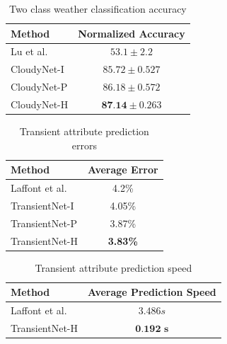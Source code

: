 \documentclass[10pt,twocolumn,letterpaper]{article}
\begin{document}
\begin{table}[t]
	\centering
	\caption{Two class weather classification accuracy}
	\begin{tabular}{ | l | c | }
		\hline
			Method & Normalized Accuracy \\ \hline \hline
			Lu et al.~\cite{lutwoclass}& $ 53.1 \pm 2.2 $ \\ \hline
			CloudyNet-I & $ 85.72 \pm 0.527 $ \\ \hline
			CloudyNet-P & $ 86.18 \pm 0.572 $ \\ \hline
			CloudyNet-H & $ \textbf{87.14} \pm 0.263 $ \\ 
		\hline
	\end{tabular}
	\label{tbl:twoclass}
\end{table}

\begin{table}[t]
	\centering
	\caption{Transient attribute prediction errors}
	\begin{tabular}{ | l | c | }
		\hline
			Method & Average Error \\ \hline \hline
			Laffont et al.~\cite{Laffont14}& 4.2\% \\ \hline
			TransientNet-I & 4.05\% \\ \hline
			TransientNet-P & 3.87\% \\ \hline
			TransientNet-H & \textbf{3.83\%} \\ 
		\hline
	\end{tabular}
	\label{tbl:transient}
\end{table}

\begin{table}[t]
	\centering
	\caption{Transient attribute prediction speed}
	\begin{tabular}{ | l | c | }
		\hline
			Method & Average Prediction Speed \\ \hline \hline
			Laffont et al.~\cite{Laffont14}& $ 3.486 s $ \\ \hline
			TransientNet-H & $ \textbf{0.192 s} $ \\ 
		\hline
	\end{tabular}
	\label{tbl:timing}
\end{table}
\end{document}

